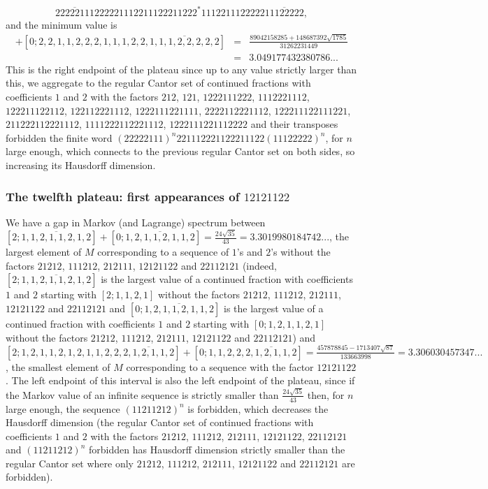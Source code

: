 \documentclass[10pt]{amsart}
\numberwithin{equation}{section}
\theoremstyle{definition}
\begin{document}
$$\overline{22222111}222221112211122211222^*1112211122222\overline{11122222},$$ and the minimum value is 
\begin{eqnarray*}[2;1,1,1,2,2,\overline{1,1,1,2,2,2,2,2}]+[0;2,2,1,1,2,2,2,1,1,1,2,2,\overline{1,1,1,2,2,2,2,2}]&=&\frac{89042158285+148687392\sqrt{1785}}{31262231449} \\ &=&3.049177432380786...
\end{eqnarray*} 
This is the right endpoint of the plateau since up to any value strictly larger than this, we aggregate to the regular Cantor set of continued fractions with coefficients $1$ and $2$ with the factors $212$, $121$, $1222111222$, $1112221112$, $122211122112$, $122112221112$, $1222111221111$, $2222112221112$, $122211122111221$, $211222112221112$, $1111222112221112$, $1222111221112222$ and their transposes forbidden the finite word $(22222111)^n 221112221122211122 (11122222)^n$, for $n$ large enough, which connects to the previous regular Cantor set on both sides, so increasing its Hausdorff dimension. 

\subsubsection{The twelfth plateau: first appearances of $12121122$} We have a gap in Markov (and Lagrange) spectrum between $[2;\overline{1,1,2,1,1,2,1,2}]+[0;\overline{1,2,1,1,2,1,1,2}]=\frac{24\sqrt{35}}{43}=3.3019980184742...$, the largest element of $M$ corresponding to a sequence of $1$'s and $2$'s without the factors $21212$, $111212$, $212111$, $12121122$ and $22112121$ (indeed, $[2;\overline{1,1,2,1,1,2,1,2}]$ is the largest value of a continued fraction with coefficients $1$ and $2$ starting with $[2;1,1,2,1]$ without the factors $21212$, $111212$, $212111$, $12121122$ and $22112121$ and $[0;\overline{1,2,1,1,2,1,1,2}]$ is the largest value of a continued fraction with coefficients $1$ and $2$ starting with $[0;1,2,1,1,2,1]$ without the factors $21212$, $111212$, $212111$, $12121122$ and $22112121$) and $[2;1,2,1,1,2,1,2,1,1,2,2,\overline{2,1,2,1,1,2}]+[0;1,1,2,2,\overline{2,1,2,1,1,2}]=\frac{457878845-1713407 \sqrt{87}}{133663998}=3.306030457347...$, the smallest element of $M$ corresponding to a sequence with the factor $12121122$. The left endpoint of this interval is also the left endpoint of the plateau, since if the Markov value of an infinite sequence is strictly smaller than $\frac{24\sqrt{35}}{43}$ then, for $n$ large enough, the sequence $(11211212)^n$ is forbidden, which decreases the Hausdorff dimension (the regular Cantor set of continued fractions with coefficients $1$ and $2$ with the factors $21212$, $111212$, $212111$, $12121122$, $22112121$ and $(11211212)^n$ forbidden has Hausdorff dimension strictly smaller than the regular Cantor set where only $21212$, $111212$, $212111$, $12121122$ and $22112121$ are forbidden). 
\end{document}
